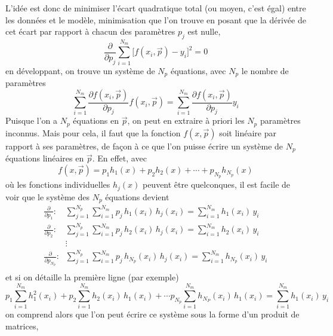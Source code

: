 L'idée est donc de minimiser l'écart quadratique total (ou moyen, c'est égal) entre les données et le modèle, minimisation que l'on trouve en posant que la dérivée de cet écart par rapport à chacun des paramètres $p_j$ est nulle,
$$
\frac{\partial}{\partial p_j}\sum\limits_{i=1}^{N_m}\big[f(x_i,\vec{p})-y_i\big]^2=0
$$
en développant, on trouve un système de $N_p$ équations, avec $N_p$ le nombre de paramètres
$$
\sum\limits_{i=1}^{N_m}\frac{\partial f(x_i,\vec{p})}{\partial p_j}f(x_i,\vec{p})=
\sum\limits_{i=1}^{N_m}\frac{\partial f(x_i,\vec{p})}{\partial p_j}y_i
$$
Puisque l'on a $N_p$ équations en $\vec{p}$, on peut en extraire à priori les $N_p$ paramètres inconnus. Mais pour cela, il faut que la fonction $f(x,\vec{p})$ soit linéaire par rapport à ses paramètres, de façon à ce que l'on puisse écrire un système de $N_p$ équations linéaires en $\vec{p}$. En effet, avec
$$
f(x,\vec{p})=p_1h_1(x)+p_2h_2(x)+\cdots+p_{N_p}h_{N_p}(x)
$$
où les fonctions individuelles $h_j(x)$ peuvent être quelconques, il est facile de voir que le système des $N_p$ équations devient
\begin{eqnarray*}
\frac{\partial }{\partial p_1} \text{:} &
\sum\limits_{j=1}^{N_p}\sum\limits_{i=1}^{N_m}p_j\,h_1(x_i)\,h_j(x_i)=
\sum\limits_{i=1}^{N_m}h_1(x_i)\,y_i\\
\frac{\partial }{\partial p_2} \text{:} &
\sum\limits_{j=1}^{N_p}\sum\limits_{i=1}^{N_m}p_j\,h_2(x_i)\,h_j(x_i)=
\sum\limits_{i=1}^{N_m}h_2(x_i)\,y_i\\
& \vdots\\
\frac{\partial }{\partial p_{N_p}} \text{:} &
\sum\limits_{j=1}^{N_p}\sum\limits_{i=1}^{N_m}p_j\,h_{N_p}(x_i)\,h_j(x_i)=
\sum\limits_{i=1}^{N_m}h_{N_p}(x_i)\,y_i\\
\end{eqnarray*}
et si on détaille la première ligne (par exemple)
$$
p_1\sum\limits_{i=1}^{N_m}h_1^2(x_i)+
p_2\sum\limits_{i=1}^{N_m}h_2(x_i)\,h_1(x_i)+
\cdots
p_{N_p}\sum\limits_{i=1}^{N_m}h_{N_P}(x_i)\,h_1(x_i)=
\sum\limits_{i=1}^{N_m}h_1(x_i)\,y_i
$$
on comprend alors que l'on peut écrire ce système sous la forme d'un produit de matrices,
